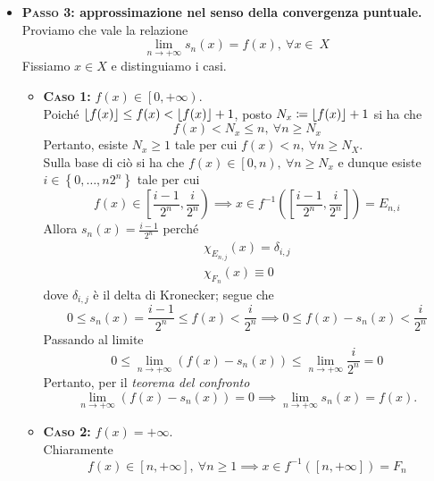 \begin{demonstration}
\begin{itemize}
\item  \textbf{\textsc{Passo 3}: approssimazione nel senso della convergenza puntuale.}\\
	Proviamo che vale la relazione
	\begin{equation*}
		\lim_{n\to+\infty}s_n(x)=f(x),\ \forall x\in\ X
	\end{equation*}
Fissiamo $x\in X$ e distinguiamo i casi.
\begin{itemize}
	\item \textbf{\textsc{Caso 1:}} $f(x)\in\left[0,+\infty\right)$.\\
	Poiché $\lfloor f(x)\rfloor\leq f(x)<\lfloor f(x)\rfloor+1$, posto $N_x\coloneqq \lfloor f(x)\rfloor+1$ si ha che
	\begin{equation*}
		f(x)< N_x\leq n,\ \forall n\geq N_x
	\end{equation*}
Pertanto, esiste $N_x\geq 1$ tale per cui $f(x)<n,\ \forall n\geq N_X$.\\
Sulla base di ciò si ha che $f(x)\in\left[0,n\right),\ \forall n\geq N_x$ e dunque esiste $i\in\left\{0,\ldots,n2^n\right\}$ tale per cui
\begin{equation*}
	f(x)\in\left[\frac{i-1}{2^n},\frac{i}{2^n}\right)\implies x\in f^{-1}\left(\left[\frac{i-1}{2^n},\frac{i}{2^n}\right]\right)=E_{n,i}
\end{equation*}
Allora $s_n(x)=\frac{i-1}{2^n}$ perché
\begin{gather*}
	\chi_{E_{n,j}}(x)=\delta_{i,j}\\
	\chi_{F_n}(x)\equiv 0
\end{gather*}
dove $\delta_{i,j}$ è il delta di Kronecker; segue che
\begin{equation*}
	0\leq s_n(x)=\frac{i-1}{2^n}\leq f(x)< \frac{i}{2^n}\implies 0\leq f(x)-s_n(x)<\frac{i}{2^n}
\end{equation*}
Passando al limite
\begin{equation*}
	0\leq \lim_{n\to+\infty}\left(f(x)-s_n(x) \right) \leq \lim_{n\to+\infty}\frac{i}{2^n}=0
\end{equation*}
Pertanto, per il \textit{teorema del confronto}
\begin{equation*}
	\lim_{n\to+\infty}\left( f(x)-s_n(x) \right)=0\implies \lim_{n\to+\infty}s_n(x)=f(x).
\end{equation*}
\item \textbf{\textsc{Caso 2:}} $f(x)=+\infty$.\\
Chiaramente
\begin{equation*}
	f(x)\in\left[n,+\infty\right],\ \forall n\geq 1\implies x\in f^{-1}\left(\left[n,+\infty\right]\right)=F_n

\end{equation*}
\end{itemize}
\end{itemize}
\end{demonstration}
